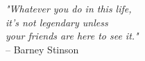 \cleardoublepage
\thispagestyle{empty}

\vspace*{0.4\textheight} %

\begin{flushright}
    \textit{"Whatever you do in this life,\\ it's not legendary unless \\ your friends are here to see it."}\\
    \vspace{0.5cm}
    -- Barney Stinson
\end{flushright}

\clearpage

